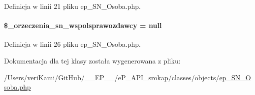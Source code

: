 Definicja w linii 21 pliku ep\-\_\-\-S\-N\-\_\-\-Osoba.\-php.

\hypertarget{classep___s_n___osoba_a1b717768eb8101ecc84cb85e8109ba25}{
\paragraph[{\$\-\_\-orzeczenia\-\_\-sn\-\_\-wspolsprawozdawcy}]{\setlength{\rightskip}{0pt plus 5cm}\$\-\_\-orzeczenia\-\_\-sn\-\_\-wspolsprawozdawcy = null\hspace{0.3cm}{\ttfamily [protected]}}}\label{classep___s_n___osoba_a1b717768eb8101ecc84cb85e8109ba25}


Definicja w linii 26 pliku ep\-\_\-\-S\-N\-\_\-\-Osoba.\-php.



Dokumentacja dla tej klasy została wygenerowana z pliku\-:\begin{DoxyCompactItemize}
\item 
/\-Users/veri\-Kami/\-Git\-Hub/\-\_\-\-\_\-\-E\-P\-\_\-\-\_\-/e\-P\-\_\-\-A\-P\-I\-\_\-srokap/classes/objects/\hyperlink{ep___s_n___osoba_8php}{ep\-\_\-\-S\-N\-\_\-\-Osoba.\-php}\end{DoxyCompactItemize}
